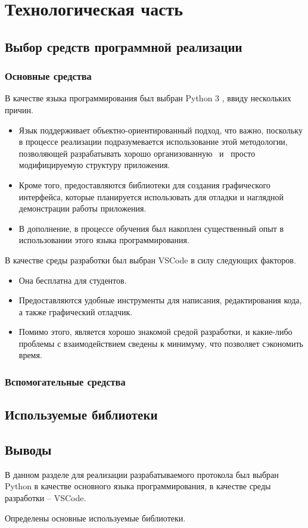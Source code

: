 \section{Технологическая часть}
\subsection{Выбор средств программной реализации}
\subsubsection{Основные средства}
В качестве языка программирования был выбран Python 3 \cite{python}, ввиду нескольких причин.
\begin{itemize}
	\item Язык поддерживает объектно-ориентированный подход, что важно, поскольку в процессе реализации подразумевается использование этой методологии, позволяющей разрабатывать хорошо организованную \, и \, просто модифицируемую структуру приложения.
	\item Кроме того, предоставляются библиотеки для создания графического интерфейса, которые планируется использовать для отладки и наглядной демонстрации работы приложения.
	\item В дополнение, в процессе обучения был накоплен существенный опыт в использовании этого языка программирования. \newline
\end{itemize}
%
В качестве среды разработки был выбран VSCode \cite{vscode} в силу следующих факторов.
\begin{itemize}
	\item Она бесплатна для студентов.
	\item Предоставляются удобные инструменты для написания, редактирования кода, а также графический отладчик.
	\item Помимо этого, является хорошо знакомой средой разработки, и какие-либо проблемы с взаимодействием сведены к минимуму, что позволяет сэкономить время. \\
\end{itemize}

\subsubsection{Вспомогательные средства}

\subsection{Используемые библиотеки}

\subsection*{Выводы}
В данном разделе для реализации разрабатываемого протокола был выбран Python в качестве основного языка программирования, в качестве среды разработки -- VSCode.

Определены основные используемые библиотеки.

\pagebreak